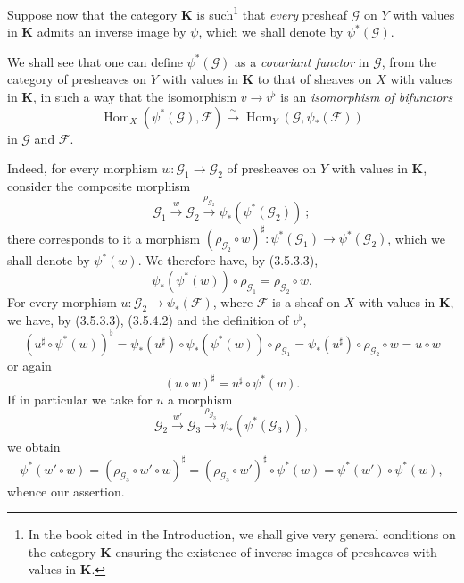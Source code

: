 
\begin{env}[3.5.4]
\label{0.3.5.4}
Suppose now that the category $\boldsymbol{K}$ is such\footnote{In
the book cited in the Introduction, we shall give very
general conditions on the category $\boldsymbol{K}$ ensuring the existence of inverse
images of presheaves with values in $\boldsymbol{K}$.} that \emph{every}
presheaf $\mathcal{G}$ on $Y$ with values in $\boldsymbol{K}$ admits an
inverse image by $\psi$, which we shall denote by $\psi^*(\mathcal{G})$.

We shall see that one can define $\psi^*(\mathcal{G})$ as a \emph{covariant
functor} in $\mathcal{G}$, from the category of presheaves on $Y$ with
values in $\boldsymbol{K}$ to that of sheaves on $X$ with values in
$\boldsymbol{K}$, in such a way that the isomorphism $v\to v^\flat$ is an
\emph{isomorphism of bifunctors}
\begin{equation*}
  \operatorname{Hom}_X(\psi^*(\mathcal{G}),\mathcal{F})
  \xrightarrow{\sim}
  \operatorname{Hom}_Y(\mathcal{G},\psi_*(\mathcal{F}))
\tag{3.5.4.1}\label{0.3.5.4.1}
\end{equation*}
in $\mathcal{G}$ and $\mathcal{F}$.

Indeed, for every morphism
$w:\mathcal{G}_1\to\mathcal{G}_2$ of presheaves on $Y$ with values in
$\boldsymbol{K}$, consider the composite morphism
\[
  \mathcal{G}_1\xrightarrow{w}\mathcal{G}_2
  \xrightarrow{\rho_{\mathcal{G}_2}}
  \psi_*(\psi^*(\mathcal{G}_2))~;
\]
there corresponds to it a morphism
$(\rho_{\mathcal{G}_2}\circ w)^\sharp:
\psi^*(\mathcal{G}_1)\to\psi^*(\mathcal{G}_2)$, which we shall denote by
$\psi^*(w)$. We therefore have, by (3.5.3.3),
\begin{equation*}
  \psi_*(\psi^*(w))\circ\rho_{\mathcal{G}_1}
  =\rho_{\mathcal{G}_2}\circ w.
\tag{3.5.4.2}\label{0.3.5.4.2}
\end{equation*}
For every morphism $u:\mathcal{G}_2\to\psi_*(\mathcal{F})$, where
$\mathcal{F}$ is a sheaf on $X$ with values in $\boldsymbol{K}$, we have,
by (3.5.3.3), (3.5.4.2) and the definition of $v^\flat$,
\[
  (u^\sharp\circ\psi^*(w))^\flat
  =\psi_*(u^\sharp)\circ\psi_*(\psi^*(w))\circ\rho_{\mathcal{G}_1}
  =\psi_*(u^\sharp)\circ\rho_{\mathcal{G}_2}\circ w
  =u\circ w
\]
or again
\begin{equation*}
  (u\circ w)^\sharp=u^\sharp\circ\psi^*(w).
\tag{3.5.4.3}\label{0.3.5.4.3}
\end{equation*}
If in particular we take for $u$ a morphism
\[
  \mathcal{G}_2\xrightarrow{w'}\mathcal{G}_3
  \xrightarrow{\rho_{\mathcal{G}_3}}
  \psi_*(\psi^*(\mathcal{G}_3)),
\]
we obtain
\[
  \psi^*(w'\circ w)
  =(\rho_{\mathcal{G}_3}\circ w'\circ w)^\sharp
  =(\rho_{\mathcal{G}_3}\circ w')^\sharp\circ\psi^*(w)
  =\psi^*(w')\circ\psi^*(w),
\]
whence our assertion.


\end{env}
